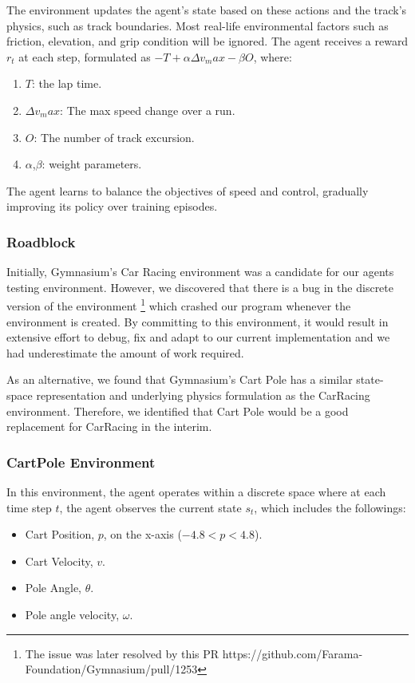 \documentclass{article}
\begin{document}
The environment updates the agent’s state based on these actions and the track's physics, such as track boundaries.
Most real-life environmental factors such as friction, elevation, and grip condition will be ignored.
The agent receives a reward \(r_t\) at each step, formulated as \( -T +
\alpha\Delta v_max - \beta O \), where:
\begin{enumerate}
  \item $T$: the lap time.
\item $\Delta v_max$: The max speed change over a run.
\item $O$: The number of track excursion.
\item $\alpha$,$\beta$: weight parameters.
\end{enumerate}

The agent learns to balance the objectives of speed and control, gradually improving its policy over training episodes.

\subsubsection{Roadblock}

Initially, Gymnasium's Car Racing environment was a candidate for our agents
testing environment. However, we discovered that there is a bug in the discrete
version of the
environment
\footnote{\label{env-issue}The issue was later resolved by this
PR https://github.com/Farama-Foundation/Gymnasium/pull/1253} which crashed our
program whenever the environment is created. By committing to this environment,
it would result in extensive effort to debug,
fix and adapt to our current implementation and we had
underestimate the amount of work required. 

As an alternative, we found that Gymnasium's
Cart Pole has a similar state-space
representation and underlying physics formulation as the CarRacing environment.
Therefore, we identified that Cart Pole would be a good replacement for
CarRacing in the interim.

\subsubsection{CartPole Environment}

In this environment, the agent operates within a discrete space where at each
time step $t$, the agent observes the current state $s_t$, which includes the
followings:
\begin{itemize}
  \item Cart Position, $p$, on the x-axis ($-4.8 < p < 4.8$).
  \item Cart Velocity, $v$.
  \item Pole Angle, $\theta$.
  \item Pole angle velocity, $\omega$.
\end{itemize}
\end{document}
